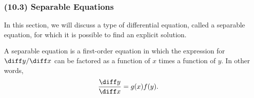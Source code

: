 \begin{frame}
\frametitle{(10.3) Separable Equations}
In this section, we will discuss a type of differential equation, called a separable equation, for which it is possible to find an explicit solution.

\begin{definition}
A separable equation is a first-order equation in which the expression for $\diff y/\diff x$ can be factored as a function of $x$ times a function of $y$.  In other words,
\[
\frac{\diff y}{\diff x} = g(x)f(y).
\]
\end{definition}

%
\end{frame}
